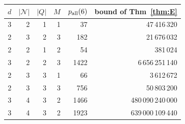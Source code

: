 \begin{tabular}{@{}rrrrrr@{}}\toprule
$d$ & $|\mathcal N|$ & $|Q|$ & $M$ & $p_{\rm all}(6)$ & bound of Thm~\ref{thm:E}\\\midrule
3 & 2 & 1 & 1 & 37 & 47\,416\,320 \\
2 & 3 & 2 & 3 & 182 & 21\,676\,032 \\
2 & 2 & 1 & 2 & 54 & 381\,024 \\
3 & 2 & 2 & 3 & 1422 & 6\,656\,251\,140 \\
2 & 3 & 3 & 1 & 66 & 3\,612\,672 \\
2 & 3 & 3 & 3 & 756 & 50\,803\,200 \\
3 & 4 & 3 & 2 & 1466 & 480\,090\,240\,000 \\
3 & 4 & 3 & 2 & 1923 & 639\,000\,109\,440 \\
\bottomrule\end{tabular}
